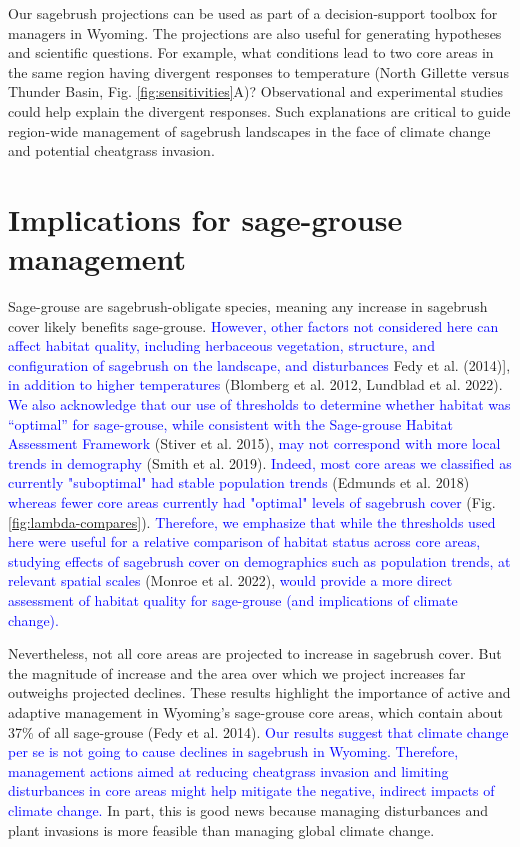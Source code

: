 \documentclass[
  12pt,
]{article}
\begin{document}
Our sagebrush projections can be used as part of a decision-support toolbox for managers in Wyoming.
The projections are also useful for generating hypotheses and scientific questions.
For example, what conditions lead to two core areas in the same region having divergent responses to temperature (North Gillette versus Thunder Basin, Fig. \ref{fig:sensitivities}A)?
Observational and experimental studies could help explain the divergent responses.
Such explanations are critical to guide region-wide management of sagebrush landscapes in the face of climate change and potential cheatgrass invasion.

\hypertarget{implications-for-sage-grouse-management}{%
\section{Implications for sage-grouse management}\label{implications-for-sage-grouse-management}}

Sage-grouse are sagebrush-obligate species, meaning any increase in sagebrush cover likely benefits sage-grouse.
\textcolor{blue}{However, other factors not considered here can affect habitat quality, including herbaceous vegetation, structure, and configuration of sagebrush on the landscape, and disturbances} Fedy et al. (2014){]}, \textcolor{blue}{in addition to higher temperatures} (Blomberg et al. 2012, Lundblad et al. 2022).
\textcolor{blue}{We also acknowledge that our use of thresholds to determine whether habitat was ``optimal'' for sage-grouse, while consistent with the Sage-grouse Habitat Assessment Framework} (Stiver et al. 2015), \textcolor{blue}{may not correspond with more local trends in demography} (Smith et al. 2019).
\textcolor{blue}{Indeed, most core areas we classified as currently "suboptimal" had stable population trends} (Edmunds et al. 2018) \textcolor{blue}{whereas fewer core areas currently had "optimal" levels of sagebrush cover} (Fig. \ref{fig:lambda-compares}).
\textcolor{blue}{Therefore, we emphasize that while the thresholds used here were useful for a relative comparison of habitat status across core areas, studying effects of sagebrush cover on demographics such as population trends, at relevant spatial scales} (Monroe et al. 2022), \textcolor{blue}{would provide a more direct assessment of habitat quality for sage-grouse (and implications of climate change).}

Nevertheless, not all core areas are projected to increase in sagebrush cover.
But the magnitude of increase and the area over which we project increases far outweighs projected declines.
These results highlight the importance of active and adaptive management in Wyoming's sage-grouse core areas, which contain about 37\% of all sage-grouse (Fedy et al. 2014).
\textcolor{blue}{Our results suggest that climate change per se is not going to cause declines in sagebrush in Wyoming.}
\textcolor{blue}{Therefore, management actions aimed at reducing cheatgrass invasion and limiting disturbances in core areas might help mitigate the negative, indirect impacts of climate change.}
In part, this is good news because managing disturbances and plant invasions is more feasible than managing global climate change.
\end{document}
